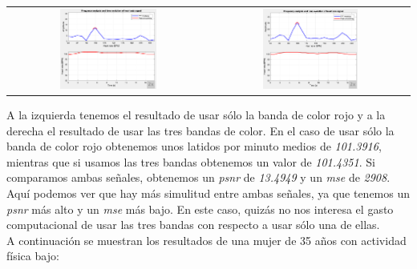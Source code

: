 \documentclass[11pt]{article}
\begin{document}
\begin{table}[H]
	\centering
	\begin{tabular}{cc}
		\includegraphics[width=0.5\textwidth]{images/sujeto4_R.png} & \includegraphics[width=0.5\textwidth]{images/sujeto4_RGB.png}
	\end{tabular}
\end{table}

A la izquierda tenemos el resultado de usar sólo la banda de color rojo y a la derecha el resultado de usar las tres bandas de color. En el caso de usar sólo la banda de color rojo obtenemos unos latidos por minuto medios de \textit{101.3916}, mientras que si usamos las tres bandas obtenemos un valor de \textit{101.4351}. Si comparamos ambas señales, obtenemos un \textit{psnr} de \textit{13.4949} y un \textit{mse} de \textit{2908}. Aquí podemos ver que hay más simulitud entre ambas señales, ya que tenemos un \textit{psnr} más alto y un \textit{mse} más bajo. En este caso, quizás no nos interesa el gasto computacional de usar las tres bandas con respecto a usar sólo una de ellas. \\

A continuación se muestran los resultados de una mujer de 35 años con actividad física bajo:
\end{document}
